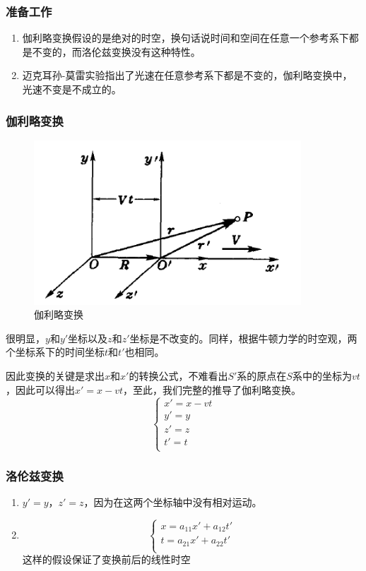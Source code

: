 \documentclass[UTF8]{ctexart}
\numberwithin{equation}{section}
\begin{document}
\subsubsection{准备工作}
\begin{enumerate}
    \item 伽利略变换假设的是绝对的时空，换句话说时间和空间在任意一个参考系下都是不变的，而洛伦兹变换没有这种特性。
    \item 迈克耳孙-莫雷实验指出了光速在任意参考系下都是不变的，伽利略变换中，光速不变是不成立的。
\end{enumerate}

\subsubsection{伽利略变换}
\begin{figure}[H]
    \centering
    \includegraphics[width = 10cm]{Galileo.png}
    \caption{伽利略变换}
\end{figure}
很明显，$y$和$y'$坐标以及$z$和$z'$坐标是不改变的。同样，根据牛顿力学的时空观，两个坐标系下的时间坐标$t$和$t'$也相同。

因此变换的关键是求出$x$和$x'$的转换公式，不难看出$S'$系的原点在$S$系中的坐标为$vt$，因此可以得出$x' = x - vt$，至此，我们完整的推导了伽利略变换。
\[
\begin{cases}
    x' = x - vt\\
    y' = y\\
    z' = z\\
    t' = t\\
\end{cases}
\]

\newpage
\subsubsection{洛伦兹变换}
\begin{enumerate}
    \item $y' = y$，$z' = z$，因为在这两个坐标轴中没有相对运动。
    \item 
    \[
    \begin{cases}
    x = a_{11}x' + a_{12}t'\\
    t = a_{21} x' +a_{22}t'\\
    \end{cases}
    \]
    这样的假设保证了变换前后的线性时空
\end{enumerate}
\end{document}
